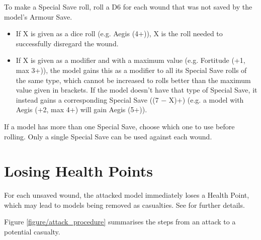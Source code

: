 To make a Special Save roll, roll a D6 for each wound that was not saved by the model's Armour Save.
\begin{itemize}
\item If X is given as a dice roll (e.g. Aegis (4+)), X is the roll needed to successfully disregard the wound.
\item If X is given as a modifier and with a maximum value (e.g. Fortitude (+1, max 3+)), the model gains this as a modifier to all its Special Save rolls of the same type, which cannot be increased to rolls better than the maximum value given in brackets. If the model doesn't have that type of Special Save, it instead gains a corresponding Special Save ((7 − X)+) (e.g. a model with Aegis (+2, max 4+) will gain Aegis (5+)).
\end{itemize}

If a model has more than one Special Save, choose which one to use before rolling. Only a single Special Save can be used against each wound.

\section{Losing Health Points}
\label{loosing_health_points}

For each unsaved wound, the attacked model immediately loses a Health Point, which may lead to models being removed as casualties. See  for further details.

Figure \ref{figure/attack_procedure} summarises the steps from an attack to a potential casualty.

\RBemc
